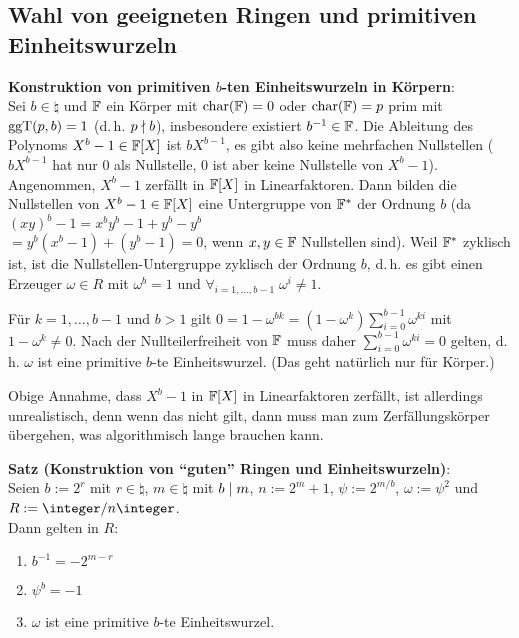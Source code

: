 \subsection{%
    Wahl von geeigneten Ringen und primitiven Einheitswurzeln%
}

\textbf{Konstruktion von primitiven $b$-ten Einheitswurzeln in Körpern}:\\
Sei $b \in \natural$ und $\mathbb{F}$ ein Körper mit $\operatorname{char}(\mathbb{F}) = 0$ oder $\operatorname{char}(\mathbb{F}) = p$ prim
mit $\operatorname{ggT}(p, b) = 1$ (d.\,h. $p \nmid b$),
insbesondere existiert $b^{-1} \in \mathbb{F}$.
Die Ableitung des Polynoms $X^b - 1 \in \mathbb{F}[X]$ ist $bX^{b-1}$,
es gibt also keine mehrfachen Nullstellen
($bX^{b-1}$ hat nur $0$ als Nullstelle, $0$ ist aber keine Nullstelle von $X^b - 1$).
Angenommen, $X^b - 1$ zerfällt in $\mathbb{F}[X]$ in Linearfaktoren.
Dann bilden die Nullstellen von $X^b - 1 \in \mathbb{F}[X]$ eine Untergruppe von $\mathbb{F}^\ast$
der Ordnung $b$
(da $(xy)^b - 1 = x^b y^b - 1 + y^b - y^b$\\
$= y^b (x^b - 1) + (y^b - 1) = 0$,
wenn $x, y \in \mathbb{F}$ Nullstellen sind).
Weil $\mathbb{F}^\ast$ zyklisch ist, ist die Nullstellen-Untergruppe zyklisch der Ordnung $b$,
d.\,h. es gibt einen Erzeuger $\omega \in R$ mit $\omega^b = 1$ und
$\forall_{i=1,\dotsc,b-1}\; \omega^i \not= 1$.

Für $k = 1, \dotsc, b - 1$ und $b > 1$ gilt
$0 = 1 - \omega^{bk} = (1 - \omega^k) \sum_{i=0}^{b-1} \omega^{ki}$ mit
$1 - \omega^k \not= 0$.
Nach der Nullteilerfreiheit von $\mathbb{F}$ muss daher $\sum_{i=0}^{b-1} \omega^{ki} = 0$ gelten,
d.\,h. $\omega$ ist eine primitive $b$-te Einheitswurzel.
(Das geht natürlich nur für Körper.)

Obige Annahme, dass $X^b - 1$ in $\mathbb{F}[X]$ in Linearfaktoren zerfällt, ist allerdings
unrealistisch, denn wenn das nicht gilt, dann muss man zum Zerfällungskörper übergehen,
was algorithmisch lange brauchen kann.

\linie

\textbf{Satz (Konstruktion von "`guten"' Ringen und Einheitswurzeln)}:\\
Seien $b := 2^r$ mit $r \in \natural$,
$m \in \natural$ mit $b \mid m$,
$n := 2^m + 1$,
$\psi := 2^{m/b}$,
$\omega := \psi^2$ und
$R := \ZnZ$.\\
Dann gelten in $R$:
\begin{enumerate}
    \item
    $b^{-1} = -2^{m-r}$

    \item
    $\psi^b = -1$

    \item
    $\omega$ ist eine primitive $b$-te Einheitswurzel.
\end{enumerate}

